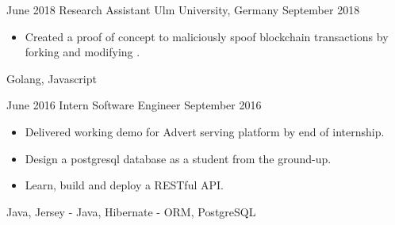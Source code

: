 %
%
%


\begin{volunteers}
    \volunteer
        {June 2018}
        {Research Assistant}
        {Ulm University, Germany}
        {September 2018}
        {
            \begin{itemize}
                \item Created a proof of concept to maliciously spoof blockchain transactions by forking and modifying .
            \end{itemize}
        }
        {
            Golang,
            Javascript
        }
    \emptySeparator

    \volunteer
        {June 2016}
        {Intern Software Engineer}
        {}
        {September 2016}
        {
            \begin{itemize}
                \item Delivered working demo for Advert serving platform by end of internship.
                \item Design a postgresql database as a student from the ground-up.
                \item Learn, build and deploy a RESTful API.
            \end{itemize}
        }
        {
            Java,
            Jersey - Java,
            Hibernate - ORM,
            PostgreSQL
        }
\end{volunteers}
